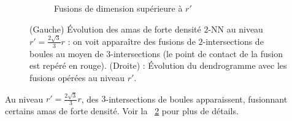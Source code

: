 \begin{figure}[htbp]
\begin{subfigure}[b]{0.53\textwidth}
        \caption{Fusions de dimension supérieure à $r'$}
        \label{fig:fusion_rprime}
    \end{subfigure}
    
    \caption{(Gauche) Évolution des amas de forte densité $2$-NN au niveau $r' = \frac{2\sqrt{3}}{3}r$ : on voit apparaître des fusions de $2$-intersections de boules au moyen de $3$-intersections (le point de contact de la fusion est repéré en rouge). (Droite) : Évolution du dendrogramme avec les fusions opérées au niveau $r'$.}
    \label{fig:complexe_rprime_exact}
\end{figure}

Au niveau $r' = \frac{2\sqrt{3}}{3}r$, des $3$-intersections de boules apparaissent, fusionnant certains amas de forte densité. Voir la \Fig~\ref{fig:complexe_rprime_exact} pour plus de détails.



